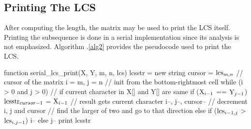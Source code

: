 \documentclass[usletter, 11pt]{extarticle}
\newcommand{\V}[1]{\textup{#1}}
\newcommand{\lcs}{\V{lcs}}
\newcommand{\seqone}{\V{X}}
\newcommand{\seqtwo}{\V{Y}}
\newcommand{\lcsstr}{\V{lcsstr}}
\begin{document}
        \subsection{Printing The LCS} After computing the length, the matrix
        may be used to print the LCS itself. Printing the subsequence is done
        in a serial implementation since its analysis is not emphasized.
        Algorithm \thesection .\ref{alg2} provides the pseudocode used to print
        the LCS.

\begin{pseudocode}[caption={Serial Longest Common Subsequence Printing},
label={alg2}]
function serial_lcs_print(X, Y, m, n, lcs)
    lcsstr = new string
    cursor = $\lcs_{m,n}$ // cursor of the matrix
    i = m, j = n // init from the bottom-rightmost cell
    while (i > 0 and j > 0)
        // if current character in X[] and Y[] are same
        if ($\seqone_{i - 1}$ == $\seqtwo_{j - 1}$)
            $\lcsstr_{cursor - 1}$ = $\seqone_{i - 1}$  // result gets current character
            i--, j--, cursor-- // decrement i, j and cursor
        // find the larger of two and go to that direction
        else if ($\lcs_{i - 1, j}$ > $\lcs_{i,j - 1}$)
            i--
        else
            j--
    print lcsstr

\end{pseudocode}
\end{document}
